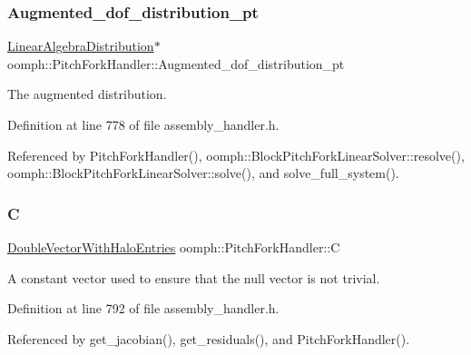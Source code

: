 \subsubsection{\texorpdfstring{Augmented\+\_\+dof\+\_\+distribution\+\_\+pt}{Augmented\_dof\_distribution\_pt}}
{\footnotesize\ttfamily \hyperlink{classoomph_1_1LinearAlgebraDistribution}{Linear\+Algebra\+Distribution}$\ast$ oomph\+::\+Pitch\+Fork\+Handler\+::\+Augmented\+\_\+dof\+\_\+distribution\+\_\+pt\hspace{0.3cm}{\ttfamily [private]}}



The augmented distribution. 



Definition at line 778 of file assembly\+\_\+handler.\+h.



Referenced by Pitch\+Fork\+Handler(), oomph\+::\+Block\+Pitch\+Fork\+Linear\+Solver\+::resolve(), oomph\+::\+Block\+Pitch\+Fork\+Linear\+Solver\+::solve(), and solve\+\_\+full\+\_\+system().

\mbox{\label{classoomph_1_1PitchForkHandler_a88f5df169c44b02f4ba563cf42241599}} 
\subsubsection{\texorpdfstring{C}{C}}
{\footnotesize\ttfamily \hyperlink{classoomph_1_1DoubleVectorWithHaloEntries}{Double\+Vector\+With\+Halo\+Entries} oomph\+::\+Pitch\+Fork\+Handler\+::C\hspace{0.3cm}{\ttfamily [private]}}



A constant vector used to ensure that the null vector is not trivial. 



Definition at line 792 of file assembly\+\_\+handler.\+h.



Referenced by get\+\_\+jacobian(), get\+\_\+residuals(), and Pitch\+Fork\+Handler().

\mbox{\label{classoomph_1_1PitchForkHandler_ad3f5fc1d7ee4918c9734e59e0611a62c}} 
